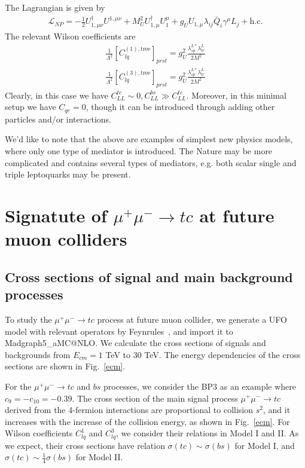 \documentclass[a4paper,11pt]{article}
\makeatletter
\newcommand{\mgamc}{Madgraph5\_aMC@NLO}
\makeatother
\begin{document}
\begin{enumerate}
        The Lagrangian is given by 
        \begin{align}
        \mathcal{L}_{NP}=-\frac{1}{2}U_{1,\mu\nu}^{\dag}U^{1,\mu\nu}+M_U^2U_{1,\mu}^{\dag}U_1^{\mu}+g_UU_{1,\mu}\lambda_{ij}\bar{Q}_{i}\gamma^{\mu}L_{j}+\textrm{h.c.}
        \end{align}
        The relevant Wilson coefficients are
        \begin{align}
            \frac{1}{\Lambda^2}[C_{lq}^{(1),\textrm{tree}}]_{prst}=g_U^2\frac{\lambda_{sp}^{L*}\lambda_{tr}^{L}}{2M^2}\\
            \frac{1}{\Lambda^2}[C_{lq}^{(3),\textrm{tree}}]_{prst}=g_U^2\frac{\lambda_{sp}^{L*}\lambda_{tr}^{L}}{2M^2}
        \end{align}
        Clearly, in this case we have $C_{LL}^{tc}\sim0,C_{LL}^{bs}\gg C_{LL}^{tc}$. Moreover, in this minimal setup we have $C_{qe}=0$, though it can be introduced through adding other particles and/or interactions.
\end{enumerate}
We'd like to note that the above are examples of simplest new physics models, where only one type of mediator is introduced. The Nature may be more complicated and contains several types of mediators, e.g. both scalar single and triple leptoquarks may be present\cite{Crivellin:2017zlb}.

\section{Signatute of $\mu^+\mu^-\to tc$ at future muon colliders }
\label{Sec:result}

\subsection{Cross sections of signal and main background processes}
To study the $\mu^+\mu^-\to tc$ process at future muon collider, 
we generate a UFO model with relevant operators by Feynrules~\cite{Alloul:2013bka}, 
and import it to \mgamc \cite{Alwall:2014hca}. 
We calculate the cross sections of signals and backgrounds from $E_{cm}=1$ TeV to $30$ TeV.  
The energy dependencies of the cross sections are shown in Fig.~\ref{ecm}. 

For the $\mu^+\mu^-\to tc$ and $bs$ processes, we consider the BP3 as an example where $c_{9}=-c_{10}=-0.39$. The cross section of the main signal process $\mu^+ \mu^- \to tc$ derived from the 4-fermion interactions are proportional to collision $s^2$, 
and it increases with the increase of the collision energy, as shown in Fig.~\ref{ecm}. 
For Wilson coefficients $C^{1}_{lq}$ and $C^{3}_{lq}$, we consider their relations in Model I and II. 
As we expect, their cross sections have relation $\sigma(tc)\sim \sigma(bs)$ for Model I, and $\sigma(tc)\sim\frac{1}{4}\sigma(bs)$ for Model II. 
\end{document}
